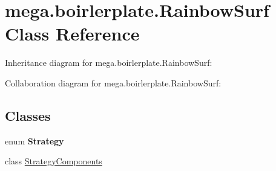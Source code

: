 \hypertarget{classmega_1_1boirlerplate_1_1_rainbow_surf}{}\section{mega.\+boirlerplate.\+Rainbow\+Surf Class Reference}
\label{classmega_1_1boirlerplate_1_1_rainbow_surf}


Inheritance diagram for mega.\+boirlerplate.\+Rainbow\+Surf\+:


Collaboration diagram for mega.\+boirlerplate.\+Rainbow\+Surf\+:
\subsection*{Classes}
\begin{DoxyCompactItemize}
\item 
enum {\bfseries Strategy}
\item 
class \hyperlink{classmega_1_1boirlerplate_1_1_rainbow_surf_1_1_strategy_components}{Strategy\+Components}
\end{DoxyCompactItemize}
